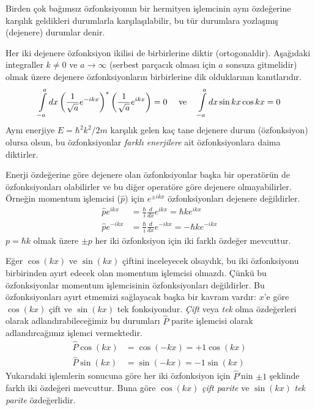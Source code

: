 \documentclass[a4paper,12pt, twoside]{article}
\begin{document}
Birden çok bağımsız özfonksiyonun bir hermityen işlemcinin aynı özdeğerine karşılık geldikleri durumlarla karşılaşılabilir, bu tür durumlara yozlaşmış (dejenere) durumlar denir.

Her iki dejenere özfonksiyon ikilisi de birbirlerine diktir (ortogonaldir). Aşağıdaki integraller $k\neq0$ ve $a\rightarrow\infty$ (serbest parçacık olması için $a$ sonsuza gitmelidir) olmak üzere dejenere özfonksiyonların birbirlerine dik olduklarının kanıtlarıdır.
\begin{align}
	{\int\limits_{-a}^{a} d x\left(\frac{1}{\sqrt a}e^{-i k x}\right)^{*} \left(\frac{1}{\sqrt a}e^{i k x}\right)=0} \text{ \quad ve \quad }
	{\int\limits_{-a}^{a} d x \sin k x \cos k x=0}
\end{align}
Aynı enerjiye $E=\hbar^{2} k^{2} / 2 m$ karşılık gelen kaç tane dejenere durum (özfonksiyon) olursa olsun, bu özfonksiyonlar \emph{farklı enerjilere} ait özfonksiyonlara daima diktirler. 

Enerji özdeğerine göre dejenere olan özfonksiyonlar başka bir operatörün de özfonksiyonları olabilirler ve bu diğer operatöre göre dejenere olmayabilirler. Örneğin momentum işlemcisi ($\hat p$) için $e^{\pm i k x}$ özfonksiyonları dejenere değildirler.
\begin{align}
\hat p e^{i k x}&=\frac{\hbar}{i} \frac{d}{d x} e^{i k x}=\hbar k e^{i k x} \nonumber\\
\hat p e^{- i k x}&=\frac{\hbar}{i} \frac{d}{d x} e^{- i k x}=- \hbar k e^{- i k x}
\end{align}
$p=\hbar k$ olmak üzere $\pm p$ her iki özfonksiyon için iki farklı özdeğer mevcuttur.

Eğer $\cos(kx)$ ve $\sin(kx)$ çiftini inceleyecek olsaydık, bu iki özfonksiyonu birbirinden ayırt edecek olan momentum işlemcisi olmazdı. Çünkü bu özfonksiyonlar momentum işlemcisinin özfonksiyonları değildirler. Bu özfonksiyonları ayırt etmemizi sağlayacak başka bir kavram vardır: $x$'e göre $\cos(kx)$ çift ve $\sin(kx)$ tek fonksiyondur. \emph{Çift} veya \emph{tek} olma özdeğerleri olarak adlandırabileceğimiz bu durumları $\hat P$ parite işlemcisi olarak adlandırcağımız işlemci vermektedir.
\begin{align}
\hat P \cos( k x)&= \cos( - k x) = +1 \cos(k x)  \nonumber\\
\hat P \sin( k x)&= \sin( - k x) = -1 \sin(k x)
\end{align}
Yukarıdaki işlemlerin sonucuna göre her iki özfonksiyon için $\hat P$'nin $\pm 1$ şeklinde farklı iki özdeğeri mevcuttur. Buna göre $\cos(kx)$ \emph{çift parite} ve $\sin(kx)$ \emph{tek parite} özdeğerlidir.
\end{document}
